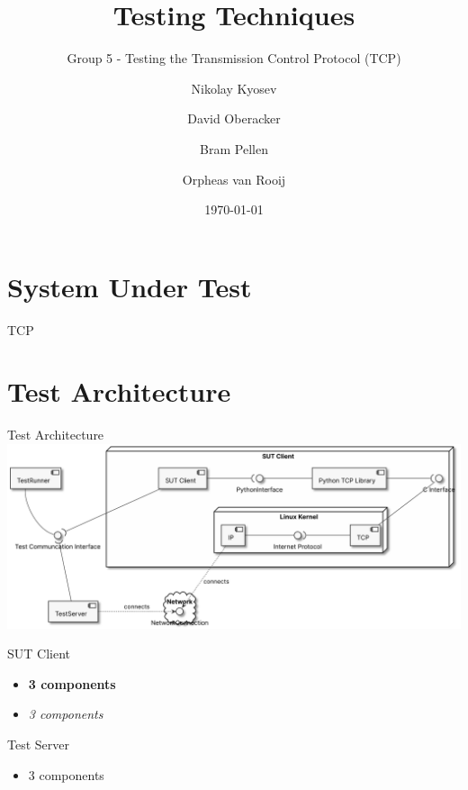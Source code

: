 \documentclass[showdate=true, slidenumbers=slide]{beamerruhuisstijl169}
\title{Testing Techniques}
\subtitle{Group 5 - Testing the Transmission Control Protocol (TCP)}
\date{\today}
\author{Nikolay Kyosev \and David Oberacker \and Bram Pellen \and Orpheas van Rooij}
\begin{document}
\begin{frame}
    \maketitle
\end{frame}

\begin{frame}
    \tableofcontents
\end{frame}

\section{System Under Test}

\begin{frame}{TCP}
    
\end{frame}

\section{Test Architecture}

\begin{frame}{Test Architecture}
    \centering
    \includegraphics[width=\textwidth]{figures/SUTArchitecture.pdf}
\end{frame}

\begin{frame}{SUT Client}
    \begin{itemize}
        \item \textbf{3 components}
        \item \textit{3 components}
    \end{itemize}
\end{frame}

\begin{frame}{Test Server}
    \begin{itemize}
        \item 3 components
    \end{itemize}
\end{frame}
\end{document}
